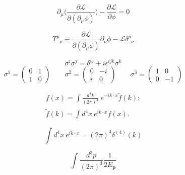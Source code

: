 \pagestyle{cheatsheet}

\begin{equation*}
  \partial_\mu\biggl(\frac{\partial \mathcal{L}}{\partial(\partial_\mu \phi)}\biggr)-\frac{\partial \mathcal{L}}{\partial \phi} = 0
\end{equation*}

\begin{equation*}
  T^{\mu}_{\phantom{\mu}\nu} \equiv \frac{\partial \mathcal{L}}{\partial(\partial_\mu \phi)} \partial_\nu \phi - \mathcal{L}\delta^{\mu}_{\phantom{\mu}\nu}
\end{equation*}

\begin{equation*}
  \sigma^i \sigma^j = \delta^{ij} + i\epsilon^{ijk}\sigma^k
\end{equation*}
\begin{equation*}
  \sigma^1=\begin{pmatrix}
    0 & 1 \\
    1 & 0
  \end{pmatrix} \qquad
  \sigma^2=\begin{pmatrix}
    0 & -i \\
    i & 0
  \end{pmatrix} \qquad
  \sigma^3=\begin{pmatrix}
    1 & 0  \\
    0 & -1
  \end{pmatrix}
\end{equation*}

\begin{gather*}
  f(x) = \int\frac{d^4 k}{(2\pi)^4}\ e^{-ik\cdot x}\tilde{f}(k); \\
  \tilde{f}(k) = \int d^4 x\ e^{ik\cdot x} f(x).
\end{gather*}

\begin{equation*}
  \int d^4 x\ e^{ik\cdot x} = (2\pi)^4 \delta^{(4)}(k)
\end{equation*}

\begin{equation*}
  \int \frac{d^3 p}{(2\pi)^3} \frac{1}{2E_{\mathbf{p}}}
\end{equation*}

